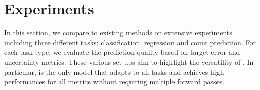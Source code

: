 \section{Experiments}
\label{sec:experiments_007}

In this section, we compare \NatPNacro{} to existing methods on extensive experiments including three different tasks: classification, regression and count prediction. For each task type, we evaluate the prediction quality based on target error and uncertainty metrics. These various set-ups aim to highlight the versatility of \NatPNacro{}. In particular, \NatPNacro{} is the only model that adapts to all tasks and achieves high performances for all metrics without requiring multiple forward passes.

\begin{table}[ht]
    \centering
   \caption{Classification results on Sensorless Drive with Categorical target distribution. Best scores among all single-pass models are in bold. Best scores among all models are starred.}
    \label{tab:sensorless-drive}
\end{table}

